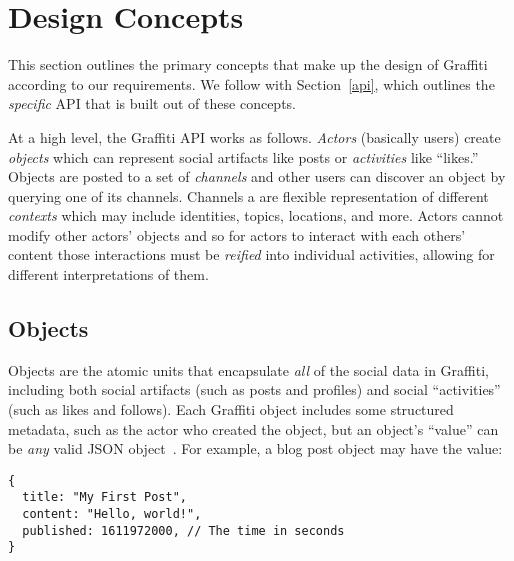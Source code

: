 \section{Design Concepts}
\label{concepts}

This section outlines the primary concepts that make up the design of Graffiti
according to our requirements.
We follow with Section~\ref{api}, which outlines the \emph{specific} API that is built out of these
concepts.

At a high level, the Graffiti API works as follows.
\emph{Actors} (basically users) create \emph{objects} which can represent
social artifacts like posts or \emph{activities} like ``likes.''
Objects are posted to a set of \emph{channels} and other users can
discover an object by querying one of its channels. Channels a are flexible representation
of different \emph{contexts} which may include identities, topics, locations,
and more.
Actors cannot modify other actors' objects and so for actors to interact with each others' content
those interactions must be \emph{reified} into individual 
activities, %
allowing for different interpretations of them.



\subsection{Objects}
\label{concepts:objects}

Objects are the atomic units that encapsulate \emph{all}
of the social data in Graffiti, including
both social artifacts (such as posts and profiles) and social ``activities'' (such as likes and follows).
Each Graffiti object includes some structured metadata,
such as the actor who created the object,
but an object's ``value'' can be \emph{any} valid JSON object~\cite{json}.
For example, a blog post object may have the value:

\begin{verbatim}
{
  title: "My First Post",
  content: "Hello, world!",
  published: 1611972000, // The time in seconds
}
\end{verbatim}

